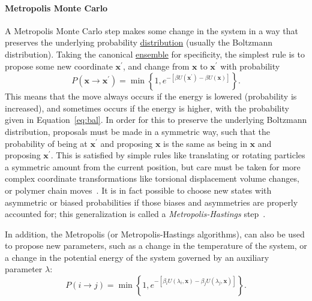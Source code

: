 \documentclass[9pt,review]{livecoms}
\newcommand{\vx}{\mathbf{x}}
\begin{document}
\hypertarget{ref:MetropolisMonteCarlo} {\paragraph{Metropolis Monte Carlo}}
A Metropolis Monte Carlo step makes some change in the system in a way that preserves the underlying probability \hyperlink{ref:Distribution} {distribution} (usually the Boltzmann distribution).  Taking the canonical \hyperlink{ref:Ensemble} {ensemble} for specificity, the simplest rule is to propose some new coordinate $\vx^\prime$, and change from $\vx$ to $\vx^\prime$ with probability
\begin{equation}
P(\vx\rightarrow \vx^\prime) = \min\left\{1, e^{-\left[\beta U(\vx^\prime)-\beta U(\vx)\right]}\right\}.
\label{eq:bal}
\end{equation}
This means that the move always occurs if the energy is lowered (probability is increased), and sometimes occurs if the energy is higher, with the probability given in Equation~\ref{eq:bal}.
In order for this to preserve the underlying Boltzmann distribution, proposals must be made in a symmetric way, such that the probability of being at $\vx^\prime$ and proposing $\vx$ is the same as being in $\vx$ and proposing $\vx^\prime$. This is satisfied by simple rules like translating or rotating particles a symmetric amount from the current position, but care must be taken for more complex coordinate transformations like torsional displacement volume changes, or polymer chain moves~\cite{Siepmann_mp_1992}.  It is in fact possible to choose new states with asymmetric or biased probabilities if those biases and asymmetries are properly accounted for; this generalization is called a \emph{Metropolis-Hastings} step~\cite{Hastings_biometrika_1970}.

In addition, the Metropolis (or Metropolis-Hastings algorithms), can also be used to propose new parameters, such as a change in the temperature of the system, or a change in the potential energy of the system governed by an auxiliary parameter $\lambda$:
\begin{equation}
    P(i\rightarrow j) = \min\left\{1,e^{-\left[\beta_i U(\lambda_i,\vx)-\beta_j U(\lambda_j,\vx)\right]}\right\}.
\end{equation}
\end{document}
